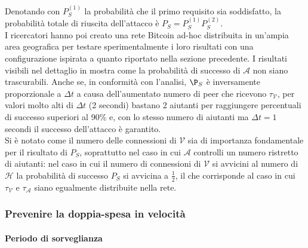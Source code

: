 Denotando con $P^{\left(1\right)}_S$ la probabilità che il primo requisito sia soddisfatto, la probabilità totale di riuscita dell'attacco è $P_S = P^{\left(1\right)}_S P^{\left(2\right)}_S$.\\
I ricercatori hanno poi creato una rete Bitcoin ad-hoc distribuita in un'ampia area geografica per testare sperimentalmente i loro risultati con una configurazione ispirata a quanto riportato nella sezione precedente. I risultati visibili nel dettaglio in \cite{doublespendig_fast} mostra come la probabilità di successo di $\mathcal{A}$ non siano trascurabili. Anche se, in conformità con l'analisi, $\P_S$ è inversamente proporzionale a $\Delta t$ a causa dell'aumentato numero di peer che ricevono $\tau_\mathcal{V}$, per valori molto alti di $\Delta t$ (2 secondi) bastano 2 aiutanti per raggiungere percentuali di successo superiori al 90\% e, con lo stesso numero di aiutanti ma $\Delta t = 1$ secondi il successo dell'attacco è garantito.\\
Si è notato come il numero delle connessioni di $\mathcal{V}$ sia di importanza fondamentale per il risultato di $P_S$, soprattutto nel caso in cui $\mathcal{A}$ controlli un numero ristretto di aiutanti: nel caso in cui il numero di connessioni di $\mathcal{V}$ si avvicini al numero di $\mathcal{H}$ la probabilità di successo $P_S$ si avvicina a $\frac{1}{2}$, il che corrisponde al caso in cui $\tau_\mathcal{V}$ e $\tau_\mathcal{A}$ siano egualmente distribuite nella rete.

\subsubsection{Prevenire la doppia-spesa in velocità}

\paragraph{Periodo di sorveglianza}

